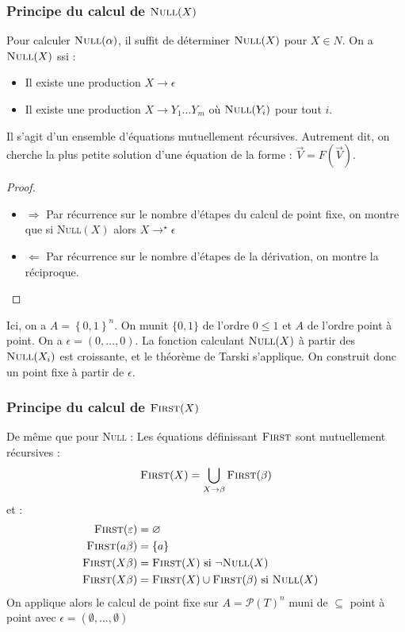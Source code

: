 \documentclass{cours}
\begin{document}
\subsubsection{Principe du calcul de $\textsc{Null}(X)$}
\begin{proposition}
    Pour calculer $\textsc{Null}(\alpha)$, il suffit de déterminer $\textsc{Null}(X)$ pour $X\in N$.
    On a $\textsc{Null}(X)$ ssi :
    \begin{itemize}
        \item Il existe une production $X \rightarrow \epsilon$
        \item Il existe une production $X \rightarrow Y_{1}\ldots Y_{m}$ où $\textsc{Null}(Y_{i})$ pour tout $i$.
    \end{itemize}
    Il s'agit d'un ensemble d'équations mutuellement récursives. Autrement dit, on cherche la plus petite solution d'une équation de la forme : $\vec{V} = F(\vec{V})$.
\end{proposition}
\begin{proof}
    \begin{itemize}
        \item $\Rightarrow$ Par récurrence sur le nombre d'étapes du calcul de point fixe, on montre que si \textsc{Null}$(X)$ alors $X \rightarrow^{\star}\epsilon$
        \item $\Leftarrow$ Par récurrence sur le nombre d'étapes de la dérivation, on montre la réciproque.
    \end{itemize}
\end{proof}
Ici, on a $A = \left\{0, 1\right\}^{n}$. On munit $\{0, 1\}$ de l'ordre $0 \leq 1$ et $A$ de l'ordre point à point. On a $\epsilon = (0, \ldots, 0)$. La fonction calculant $\textsc{Null}(X)$ à partir des $\textsc{Null}(X_{i})$ est croissante, et le théorème de Tarski s'applique. On construit donc un point fixe à partir de $\epsilon$.

\subsubsection{Principe du calcul de $\textsc{First}(X)$}
De même que pour \textsc{Null} : Les équations définissant $\textsc{First}$ sont mutuellement récursives :
\[
    \textsc{First}(X) = \bigcup_{X \rightarrow \beta} \textsc{First}(\beta)
\]
et :
\begin{equation*}
    \begin{aligned}
        \textsc{First}(\epsilon) & = \emptyset                                                                 & \\
        \textsc{First}(a\beta)   & = \left\{a\right\}                                                          & \\
        \textsc{First}(X\beta)   & = \textsc{First}(X) \text{ si } \lnot\textsc{Null}(X)                       & \\
        \textsc{First}(X\beta)   & = \textsc{First}(X) \cup \textsc{First}(\beta) \text{ si } \textsc{Null}(X) &
    \end{aligned}
\end{equation*}
On applique alors le calcul de point fixe sur $A = \mathcal{P}(T)^{n}$ muni de $\subseteq$ point à point avec $\epsilon = (\emptyset, \ldots, \emptyset)$
\end{document}
